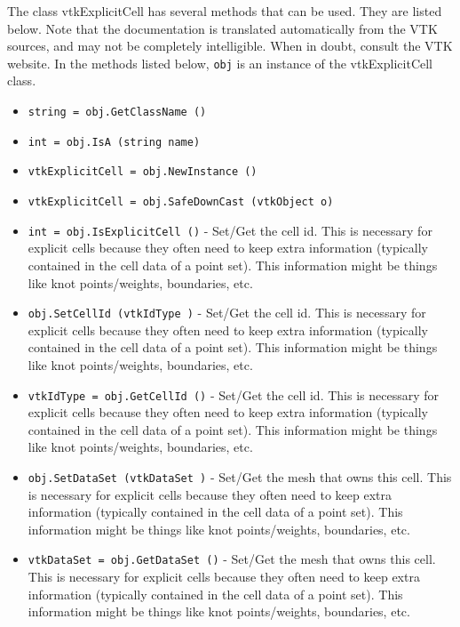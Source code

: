 The class vtkExplicitCell has several methods that can be used.
  They are listed below.
Note that the documentation is translated automatically from the VTK sources,
and may not be completely intelligible.  When in doubt, consult the VTK website.
In the methods listed below, \verb|obj| is an instance of the vtkExplicitCell class.
\begin{itemize}
\item  \verb|string = obj.GetClassName ()|

\item  \verb|int = obj.IsA (string name)|

\item  \verb|vtkExplicitCell = obj.NewInstance ()|

\item  \verb|vtkExplicitCell = obj.SafeDownCast (vtkObject o)|

\item  \verb|int = obj.IsExplicitCell ()| -  Set/Get the cell id. This is necessary for explicit cells because they
 often need to keep extra information (typically contained in the
 cell data of a point set). This information might be things like
 knot points/weights, boundaries, etc.

\item  \verb|obj.SetCellId (vtkIdType )| -  Set/Get the cell id. This is necessary for explicit cells because they
 often need to keep extra information (typically contained in the
 cell data of a point set). This information might be things like
 knot points/weights, boundaries, etc.

\item  \verb|vtkIdType = obj.GetCellId ()| -  Set/Get the cell id. This is necessary for explicit cells because they
 often need to keep extra information (typically contained in the
 cell data of a point set). This information might be things like
 knot points/weights, boundaries, etc.

\item  \verb|obj.SetDataSet (vtkDataSet )| -  Set/Get the mesh that owns this cell. This is necessary for explicit
 cells because they often need to keep extra information (typically
 contained in the cell data of a point set). This information might be
 things like knot points/weights, boundaries, etc.

\item  \verb|vtkDataSet = obj.GetDataSet ()| -  Set/Get the mesh that owns this cell. This is necessary for explicit
 cells because they often need to keep extra information (typically
 contained in the cell data of a point set). This information might be
 things like knot points/weights, boundaries, etc.

\end{itemize}
